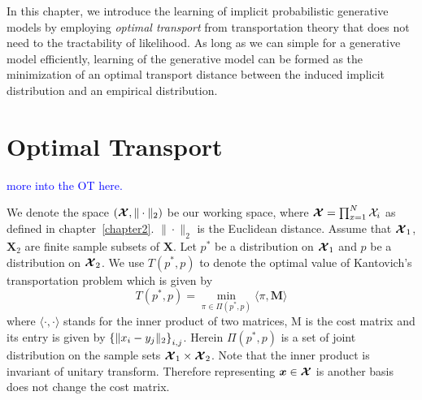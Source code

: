 In this chapter, we introduce the learning of implicit probabilistic generative models by employing \textit{optimal transport} from transportation theory that does not need to the tractability of likelihood. As long as we can simple for a generative model efficiently, learning of the generative model can be formed as the minimization of an optimal transport distance between the induced implicit distribution and an empirical distribution.

\section{Optimal Transport}
\textcolor{blue}{more into the OT here.} 

We denote the space $(\bm{\mathcal{X}},\|\cdot\|_2)$ be our working space, where $\bm{\mathcal{X}} = \prod_{x=1}^{N} \mathcal{X}_i$ as defined in chapter~\ref{chapter2}. $\|\cdot\|_2$ is the Euclidean distance. Assume that $\bm{\mathcal{X}}_1$, $\bm{X}_2$ are finite sample subsets of $\bm{X}$. Let $p^{\ast}$ be a distribution on $\bm{\mathcal{X}}_1$ and $p$ be a distribution on $\bm{\mathcal{X}}_2$. We use $T(p^{\ast},p)$ to denote the optimal value of Kantovich's transportation problem\cite{villani2003topics} which is given by
\begin{equation}
  T(p^{\ast}, p) = \min_{\pi\in\Pi(p^{\ast}, p)}\langle\pi,\bm{M}\rangle
\end{equation}
where $\langle\cdot,\cdot\rangle$ stands for the inner product of
two matrices, M is the cost matrix and its entry is given by $\left\{ \| x_i-y_j \|_{2} \right\}_{i,j}$.
Herein $\Pi(p^{\ast}, p)$ is a set of joint distribution on the sample sets $\bm{\mathcal{X}}_1\times\bm{\mathcal{X}}_2$. Note that the inner product is invariant of unitary transform. Therefore representing $\bm{x}\in \bm{\mathcal{X}}$ is another basis does not change the cost matrix.\\

